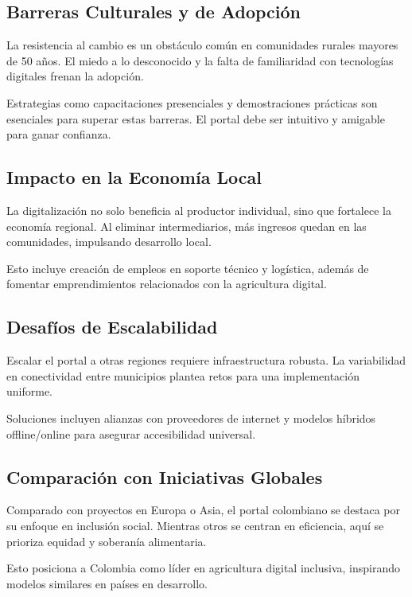 \subsection{Barreras Culturales y de Adopción}
La resistencia al cambio es un obstáculo común en comunidades rurales mayores de 50 años. El miedo a lo desconocido y la falta de familiaridad con tecnologías digitales frenan la adopción.

Estrategias como capacitaciones presenciales y demostraciones prácticas son esenciales para superar estas barreras. El portal debe ser intuitivo y amigable para ganar confianza.

\subsection{Impacto en la Economía Local}
La digitalización no solo beneficia al productor individual, sino que fortalece la economía regional. Al eliminar intermediarios, más ingresos quedan en las comunidades, impulsando desarrollo local.

Esto incluye creación de empleos en soporte técnico y logística, además de fomentar emprendimientos relacionados con la agricultura digital.

\subsection{Desafíos de Escalabilidad}
Escalar el portal a otras regiones requiere infraestructura robusta. La variabilidad en conectividad entre municipios plantea retos para una implementación uniforme.

Soluciones incluyen alianzas con proveedores de internet y modelos híbridos offline/online para asegurar accesibilidad universal.

\subsection{Comparación con Iniciativas Globales}
Comparado con proyectos en Europa o Asia, el portal colombiano se destaca por su enfoque en inclusión social. Mientras otros se centran en eficiencia, aquí se prioriza equidad y soberanía alimentaria.

Esto posiciona a Colombia como líder en agricultura digital inclusiva, inspirando modelos similares en países en desarrollo.